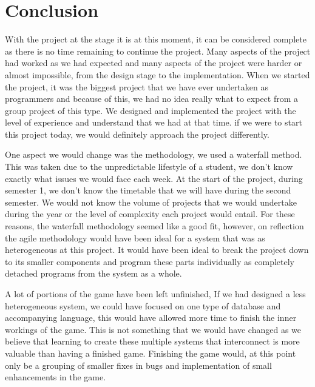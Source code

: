 
\chapter{Conclusion}

With the project at the stage it is at this moment, it can be considered complete as there is no time remaining to continue the project. Many aspects of the project had worked as we had expected and many aspects of the project were harder or almost impossible, from the design stage to the implementation.
When we started the project, it was the biggest project that we have ever undertaken as programmers and because of this, we had no idea really what to expect from a group project of this type. We designed and implemented the project with the level of experience and understand that we had at that time. if we were to start this project today, we would definitely approach the project differently.\newline

One aspect we would change was the methodology, we used a waterfall method. This was taken due to the unpredictable lifestyle of a student, we don't know exactly what issues we would face each week. At the start of the project, during semester 1, we don't know the timetable that we will have during the second semester. We would not know the volume of projects that we would undertake during the year or the level of complexity each project would entail. For these reasons, the waterfall methodology seemed like a good fit, however, on reflection the agile methodology would have been ideal for a system that was as heterogeneous at this project. It would have been ideal to break the project down to its smaller components and program these parts individually as completely detached programs from the system as a whole.\newline

A lot of portions of the game have been left unfinished, If we had designed a less heterogeneous system, we could have focused on one type of database and accompanying language, this would have allowed more time to finish the inner workings of the game. This is not something that we would have changed as we believe that learning to create these multiple systems that interconnect is more valuable than having a finished game. Finishing the game would, at this point only be a grouping of smaller fixes in bugs and implementation of small enhancements in the game.\newline
